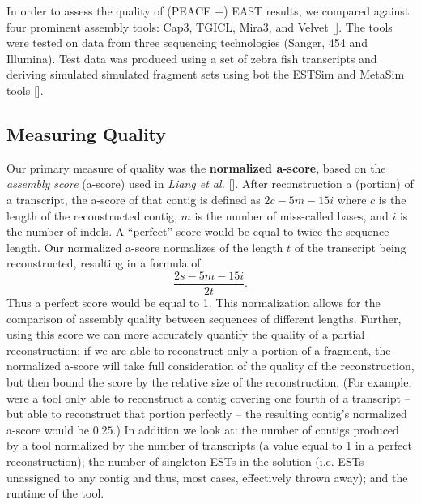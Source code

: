 \documentclass{bioinfo}
\newcommand{\peace} {{\small PEACE}}
\newcommand{\capthree} {{\small Cap3}}
\newcommand{\estsim}{{\small ESTSim}}
\newcommand{\metasim} {{\small MetaSim}}
\newcommand{\tgicl} {{\small TGICL}}
\newcommand{\east} {{\small EAST}}
\newcommand{\velvet}{{\small Velvet}}
\newcommand{\mira}{{\small Mira3}}
\begin{document}

In order to assess the quality of (\peace\/ +) \east\/ results, we
compared against four prominent assembly tools: \capthree, \tgicl,
\mira, and \velvet\/ [\cite{Huang99,Pertea03,Chevreux04,Zerbino08}].
The tools were tested on data from three sequencing technologies
(Sanger, 454 and Illumina).  Test data was produced using a set of
zebra fish transcripts \cite{Hazelhurst08} and deriving simulated
simulated fragment sets using bot the \estsim\/ and \metasim\/ tools
[\cite{Hazelhurst03,Richter08}].

\subsection*{Measuring Quality}
Our primary measure of quality was the {\bf normalized a-score}, based
on the {\it assembly score} (a-score) used in {\it Liang et al.}
[\cite{Liang00}].  After reconstruction a (portion) of a transcript,
the a-score of that contig is defined as $2c - 5m - 15i$ where $c$ is
the length of the reconstructed contig, $m$ is the number of
miss-called bases, and $i$ is the number of indels.  A ``perfect''
score would be equal to twice the sequence length.  Our normalized
a-score normalizes of the length $t$ of the transcript being
reconstructed, resulting in a formula of:
$$\frac{2s - 5m - 15i}{2t}.$$
Thus a perfect score would be equal to 1.  This normalization allows
for the comparison of assembly quality between sequences of different
lengths. Further, using this score we can more accurately quantify the
quality of a partial reconstruction: if we are able to reconstruct
only a portion of a fragment, the normalized a-score will take full
consideration of the quality of the reconstruction, but then bound the
score by the relative size of the reconstruction.  (For example, were
a tool only able to reconstruct a contig covering one fourth of a
transcript -- but able to reconstruct that portion perfectly -- the
resulting contig's normalized a-score would be $0.25$.)  In addition
we look at: the number of contigs produced by a tool normalized by the
number of transcripts (a value equal to 1 in a perfect
reconstruction); the number of singleton ESTs in the solution
(i.e. ESTs unassigned to any contig and thus, most cases, effectively
thrown away); and the runtime of the tool.
\end{document}
